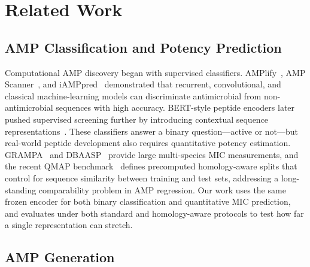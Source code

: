 \section{Related Work}
\label{sec:related}

\subsection{AMP Classification and Potency Prediction}

Computational AMP discovery began with supervised classifiers.
AMPlify~\citep{amplify}, AMP Scanner~\citep{ampscanner}, and
iAMPpred~\citep{iamppred} demonstrated that recurrent, convolutional, and
classical machine-learning models can discriminate antimicrobial from
non-antimicrobial sequences with high accuracy.
BERT-style peptide encoders later pushed supervised screening further by
introducing contextual sequence representations~\citep{ampbert,peptidebert}.
These classifiers answer a binary question---active or not---but
real-world peptide development also requires quantitative potency estimation.
GRAMPA~\citep{grampa} and DBAASP~\citep{dbaasp3} provide large multi-species
MIC measurements, and the recent QMAP benchmark~\citep{qmap2026} defines
precomputed homology-aware splits that control for sequence similarity between
training and test sets, addressing a long-standing comparability problem in AMP
regression.
Our work uses the same frozen encoder for both binary classification and
quantitative MIC prediction, and evaluates under both standard and
homology-aware protocols to test how far a single representation can stretch.

\subsection{AMP Generation}

